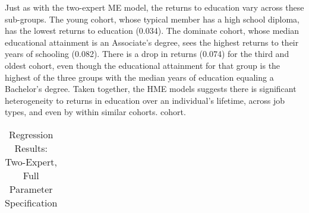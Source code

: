 \documentclass[12pt]{article}
\theoremstyle{definition}
\begin{document}
Just as with the two-expert ME model, the returns to education vary across these 
sub-groups. The young cohort, whose typical member has a high school diploma, has
the lowest returns to education (0.034). The dominate cohort, whose median educational attainment 
is an Associate's degree, sees the highest returns to their years of schooling (0.082).
There is a drop in returns (0.074) for the third and oldest cohort, even though the educational
attainment for that group is the highest of the three groups with the median years of
education equaling a Bachelor's degree. Taken together, the HME models
suggests there is significant heterogeneity to returns in education over an
individual's lifetime, across job types, and even by within similar cohorts.
cohort.


\begin{landscape}
  \begin{table} \centering
    \caption{Regression Results: Two-Expert, Full Parameter Specification}
      \begin{threeparttable}
        \begin{tabular}[l]{l r l r l c r l c r l r l r l}
  

\end{tabular}
\end{threeparttable}
\end{table}
\end{landscape}
\end{document}

